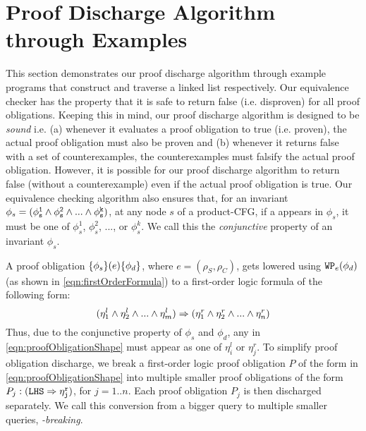 \section{Proof Discharge Algorithm through Examples}
\label{sec:syn-examples}
This section demonstrates our proof discharge algorithm through example programs
that construct and traverse a linked list respectively. Our equivalence checker has the property
that it is safe to return false (i.e. disproven) for all proof obligations. Keeping this in mind,
our proof discharge algorithm is designed to be {\em sound} i.e. (a) whenever it evaluates a proof obligation
to true (i.e. proven), the actual proof obligation must also be proven and (b) whenever it returns
false with a set of counterexamples, the counterexamples must falsify the actual proof obligation.
However, it is possible for our proof discharge algorithm to return false (without a counterexample)
even if the actual proof obligation is true.
Our equivalence checking algorithm also ensures that, for an invariant
$\phi_s=({\tt \phi^{1}_s \land \phi^{2}_s \land ... \land \phi^{k}_s})$,
at any node $s$ of a product-CFG,
if a \recursiveRelation{} appears in $\phi_s$, it
must be one of $\phi^{1}_s$, $\phi^{2}_s$, ..., or $\phi^{k}_s$. We call
this the {\em conjunctive \recursiveRelation{}} property of an invariant $\phi_s$.

A proof obligation
$\{\phi_s\}(e)\{\phi_d\}$, where $e=(\rho_S,\rho_C)$,
gets lowered using
${\tt WP}_{e}(\phi_d)$ (as shown in \cref{eqn:firstOrderFormula}) to a first-order logic formula of the following form:
\vspace{-5px}
\begin{equation}
\label{eqn:proofObligationShape}
(\eta^{l}_1 \land \eta^{l}_2 \land ... \land \eta^{l}_m) \Rightarrow (\eta^{r}_1 \land \eta^{r}_2 \land ... \land \eta^{r}_n)
\vspace{-5px}
\end{equation}
Thus, due to the conjunctive \recursiveRelation{} property of $\phi_s$ and $\phi_d$, any
\recursiveRelation{} in \cref{eqn:proofObligationShape} must appear as
one of $\eta^{l}_i$ or $\eta^{r}_j$.
To simplify proof obligation discharge,
we break a first-order logic proof obligation $P$ of the form in \cref{eqn:proofObligationShape}
into multiple smaller proof obligations
of the form
$P_j:({\tt LHS}{} \Rightarrow{\tt \eta^{r}_j})$, for $j=1..n$. Each proof obligation
$P_j$ is then discharged separately.  We call this conversion from
a bigger query to multiple smaller queries, {\em \rhs{}-breaking}.

